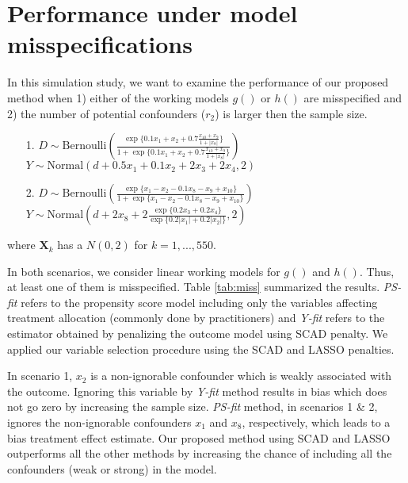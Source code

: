 \documentclass[11pt]{statsoc}
\begin{document}
\section{Performance under model misspecifications}
\label{app:sim}
In this simulation study, we want to examine the performance of our proposed method when 1) either of the working models $g()$ or $h()$ are misspecified and 2) the number of potential confounders ($r_2$) is larger then the sample size.

\begin{enumerate}
\item[1.] $D \sim \text{Bernoulli}\left(\frac{\exp\{0.1x_1+x_2+0.7 \frac{x_{10}+x_{9}}{1+|x_8|}\}}{1+\exp\{0.1x_1+x_2+0.7 \frac{x_{10}+x_{9}}{1+|x_8|}\}}\right)$ \\ 
$Y \sim \text{Normal}(d+0.5x_1+0.1x_2+2x_3+2x_4, 2)$
\item[2.] $D \sim \text{Bernoulli}\left(\frac{\exp\{x_1-x_2-0.1x_{8}-x_{9}+x_{10}\}}{1+\exp\{x_1-x_2-0.1x_{8}-x_{9}+x_{10}\}}\right)$ \\ 
$Y \sim \text{Normal}(d+2x_8+2 \frac{\exp\{0.2x_3+0.2x_4\}}{\exp\{0.2|x_1|+0.2|x_2|\}}, 2)$
\end{enumerate}
where ${\bm{X}}_k$ has a $N(0,2)$ for $k=1,...,550$. 

In both scenarios, we consider linear working models for $g()$ and $h()$. Thus, at least one of them is misspecified. Table \ref{tab:miss} summarized the results. \textit{PS-fit} refers to the propensity score model including only the variables affecting treatment allocation (commonly done by practitioners) and {\it {Y-fit}} refers to the estimator obtained by penalizing the outcome model using SCAD penalty. We applied our variable selection procedure using the SCAD and LASSO penalties.   

In scenario 1, $x_2$ is a non-ignorable confounder which is weakly associated with the outcome. Ignoring this variable by {\it {Y-fit}} method results in bias which does not go zero by increasing the sample size.  \textit{PS-fit} method, in scenarios 1 \& 2, ignores  the non-ignorable confounders $x_1$ and $x_8$, respectively, which leads to a bias treatment effect estimate. Our proposed method using SCAD and LASSO outperforms all the other methods by increasing the chance of including all the confounders (weak or strong) in the model. 
\end{document}

